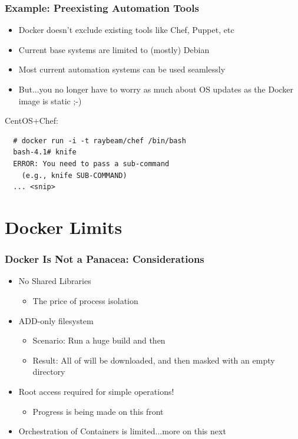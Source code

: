 \documentclass[xcolor=dvipsnames]{beamer}
\newcommand{\cpause}{}
\begin{document}
\begin{frame}[fragile]
  \frametitle{Example: Preexisting Automation Tools}
  
  \begin{itemize}
    \item Docker doesn't exclude existing tools like Chef, Puppet, etc \cpause

    \item Current base systems are limited to (mostly) Debian \cpause

    \item Most current automation systems can be used seamlessly \cpause 

    \item But...you no longer have to worry as much about OS updates as the 
    Docker image is static ;-) \cpause
  \end{itemize}

  CentOS+Chef: \cpause
  \begin{lstlisting}
  # docker run -i -t raybeam/chef /bin/bash
  bash-4.1# knife
  ERROR: You need to pass a sub-command 
    (e.g., knife SUB-COMMAND)
  ... <snip>
  \end{lstlisting}

\end{frame}


\section{Docker Limits}

\begin{frame}[fragile]
  \frametitle{Docker Is Not a Panacea: Considerations}

  \begin{itemize}
    \item No Shared Libraries
      \begin{itemize}
      \item The price of process isolation \cpause
      \end{itemize}
    \item ADD-only filesystem \cpause
      \begin{itemize} 
        \item Scenario: Run a huge build and then  \cpause
        \item Result: All of  will be downloaded, and then masked with an empty directory \cpause
      \end{itemize}
    \item Root access required for simple operations! \cpause
      \begin{itemize}
        \item Progress is being made on this front \cpause
      \end{itemize}
    \item Orchestration of Containers is limited...more on this next
  \end{itemize} 

\end{frame}
\end{document}
